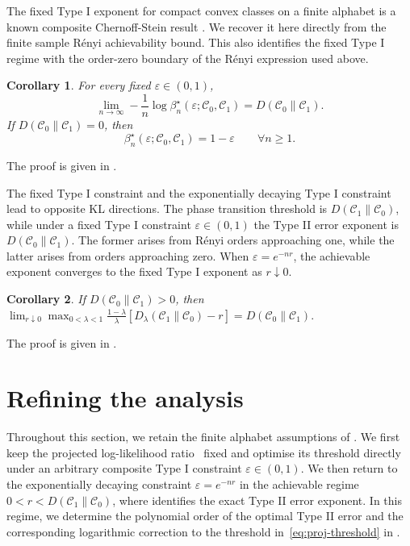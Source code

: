 \documentclass[journal,10pt,draftclsnofoot,onecolumn]{IEEEtran}
\newtheorem{corollary}{Corollary}
\begin{document}
The fixed Type I exponent for compact convex classes on a finite
alphabet is a known composite Chernoff-Stein result \cite{brandao2020adversarial,mosonyi2021error}. We recover it here directly from the finite sample R\'enyi achievability bound. This also identifies the fixed Type I regime with the order-zero boundary of the R\'enyi expression used above.
\begin{corollary}
\label{thm:fixed-type-one-exponent}
For every fixed $\varepsilon\in(0,1)$,
\begin{equation}
\lim_{n\to\infty}-\frac{1}{n} \log \beta_n^\star(\varepsilon;\mathcal C_0,\mathcal C_1)=D(\mathcal C_0\|\mathcal C_1).
\label{eq:fixed-type-one-exponent}
\end{equation}
If $D(\mathcal C_0\|\mathcal C_1)=0$, then 
\begin{equation*}
\beta_n^\star(\varepsilon;\mathcal C_0,\mathcal C_1)=1-\varepsilon \qquad \forall n\geq1.
\end{equation*}
\end{corollary}
The proof is given in .

The fixed Type I constraint and the exponentially decaying Type I
constraint lead to opposite KL directions. The phase transition threshold is $D(\mathcal C_1\|\mathcal C_0)$, while under a fixed Type I constraint $\varepsilon\in(0,1)$ the Type II error exponent is $D(\mathcal C_0\|\mathcal C_1)$. The former arises from R\'enyi orders approaching one, while the latter arises from orders approaching zero. When $\varepsilon=e^{-nr}$, the achievable exponent converges to the fixed Type I exponent as $r\downarrow0$.
\begin{corollary}
\label{cor:zero-rate-boundary}
If $D(\mathcal C_0\|\mathcal C_1)>0$, then $\lim_{r\downarrow0} \max_{0<\lambda<1} \frac{1-\lambda}{\lambda} \left[ D_\lambda(\mathcal C_1\|\mathcal C_0)-r \right]=D(\mathcal C_0\|\mathcal C_1).$
\end{corollary}
The proof is given in .

\section{Refining the analysis}
\label{sec:finite-blocklength-exactness}

Throughout this section, we retain the finite alphabet assumptions of . We first keep the projected log-likelihood ratio~ fixed and optimise its threshold directly under an arbitrary composite Type I constraint $\varepsilon\in(0,1)$. We then return to the exponentially decaying constraint $\varepsilon=e^{-nr}$ in the achievable regime $0<r<D(\mathcal C_1\|\mathcal C_0)$, where  identifies the exact Type II error exponent. In this regime, we determine the polynomial order of the optimal Type II error and the corresponding logarithmic correction to the threshold
in~\eqref{eq:proj-threshold} in .
\end{document}
